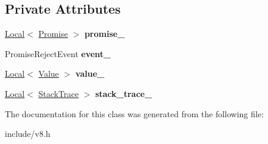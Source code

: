 \subsection*{Private Attributes}
\begin{DoxyCompactItemize}
\item 
\hyperlink{classv8_1_1_local}{Local}$<$ \hyperlink{classv8_1_1_promise}{Promise} $>$ {\bfseries promise\+\_\+}\hypertarget{classv8_1_1_promise_reject_message_a21a47d63f57740ac79e90a1f8d4de1a3}{}\label{classv8_1_1_promise_reject_message_a21a47d63f57740ac79e90a1f8d4de1a3}

\item 
Promise\+Reject\+Event {\bfseries event\+\_\+}\hypertarget{classv8_1_1_promise_reject_message_a40c18262bff9955b6accec1a6c069a58}{}\label{classv8_1_1_promise_reject_message_a40c18262bff9955b6accec1a6c069a58}

\item 
\hyperlink{classv8_1_1_local}{Local}$<$ \hyperlink{classv8_1_1_value}{Value} $>$ {\bfseries value\+\_\+}\hypertarget{classv8_1_1_promise_reject_message_a06067111ef1233d7c3b38fcc8a77d5a2}{}\label{classv8_1_1_promise_reject_message_a06067111ef1233d7c3b38fcc8a77d5a2}

\item 
\hyperlink{classv8_1_1_local}{Local}$<$ \hyperlink{classv8_1_1_stack_trace}{Stack\+Trace} $>$ {\bfseries stack\+\_\+trace\+\_\+}\hypertarget{classv8_1_1_promise_reject_message_a28e8114e1e9d7b9ed60a546a3fcf7ff7}{}\label{classv8_1_1_promise_reject_message_a28e8114e1e9d7b9ed60a546a3fcf7ff7}

\end{DoxyCompactItemize}


The documentation for this class was generated from the following file\+:\begin{DoxyCompactItemize}
\item 
include/v8.\+h\end{DoxyCompactItemize}
